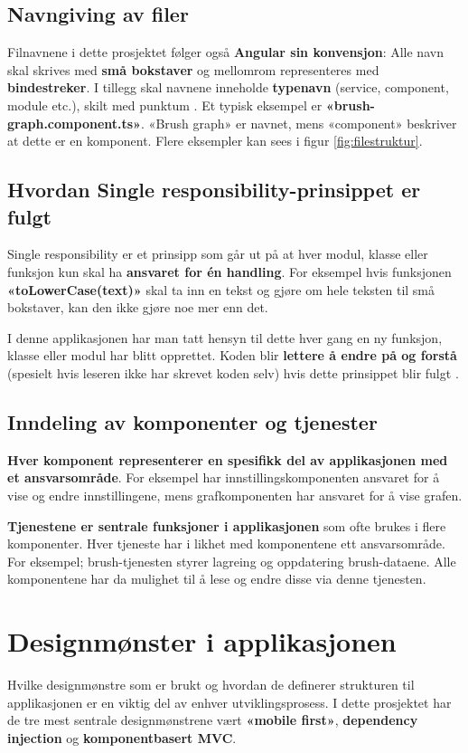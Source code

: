 \subsection{Navngiving av filer}
Filnavnene i dette prosjektet følger også \textbf{Angular sin konvensjon}: Alle navn skal skrives med \textbf{små bokstaver} og mellomrom representeres med \textbf{bindestreker}. I tillegg skal navnene inneholde \textbf{typenavn} (service, component, module etc.), skilt med punktum \cite{AngularfileNames}. Et typisk eksempel er \textbf{«brush-graph.component.ts»}. «Brush graph» er navnet, mens «component» beskriver at dette er en komponent. Flere eksempler kan sees i figur \ref{fig:filestruktur}.

\subsection{Hvordan Single responsibility-prinsippet er fulgt}
Single responsibility er et prinsipp som går ut på at hver modul, klasse eller funksjon kun skal ha \textbf{ansvaret for én handling}. For eksempel hvis funksjonen \textbf{«toLowerCase(text)»} skal ta inn en tekst og gjøre om hele teksten til små bokstaver, kan den ikke gjøre noe mer enn det.

I denne applikasjonen har man tatt hensyn til dette hver gang en ny funksjon, klasse eller modul har blitt opprettet. Koden blir \textbf{lettere å endre på og forstå} (spesielt hvis leseren ikke har skrevet koden selv) hvis dette prinsippet blir fulgt \cite{SingleReponsibility}.  

\subsection{Inndeling av komponenter og tjenester}
\textbf{Hver komponent representerer en spesifikk del av applikasjonen med et ansvarsområde}. For eksempel har innstillingskomponenten ansvaret for å vise og endre innstillingene, mens grafkomponenten har ansvaret for å vise grafen. 

\textbf{Tjenestene er sentrale funksjoner i applikasjonen} som ofte brukes i flere komponenter. Hver tjeneste har i likhet med komponentene ett ansvarsområde. For eksempel; brush-tjenesten styrer lagreing og oppdatering brush-dataene. Alle komponentene har da mulighet til å lese og endre disse via denne tjenesten.

\section{Designmønster i applikasjonen}
Hvilke designmønstre som er brukt og hvordan de definerer strukturen til applikasjonen er en viktig del av enhver utviklingsprosess. I dette prosjektet har de tre mest sentrale designmønstrene vært \textbf{«mobile first»}, \textbf{dependency injection} og \textbf{komponentbasert MVC}.

